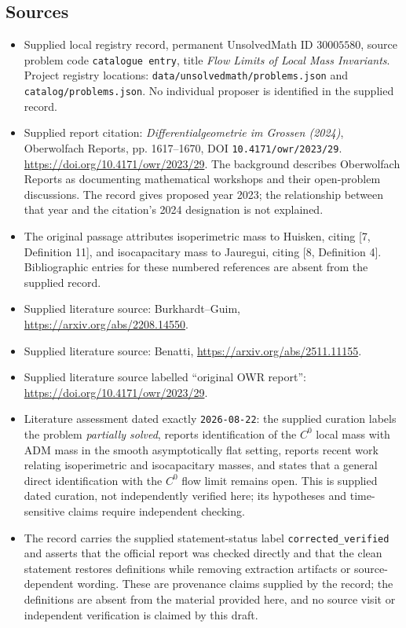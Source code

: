 \documentclass[11pt]{article}
\begin{document}
\subsection{Sources}
\begin{itemize}
\item Supplied local registry record, permanent UnsolvedMath ID \(30005580\), source problem code \texttt{catalogue entry}, title \emph{Flow Limits of Local Mass Invariants}. Project registry locations: \texttt{data/unsolvedmath/problems.json} and \texttt{catalog/problems.json}. No individual proposer is identified in the supplied record.
\item Supplied report citation: \emph{Differentialgeometrie im Grossen (2024)}, Oberwolfach Reports, pp. 1617--1670, DOI \texttt{10.4171/owr/2023/29}. \url{https://doi.org/10.4171/owr/2023/29}. The background describes Oberwolfach Reports as documenting mathematical workshops and their open-problem discussions. The record gives proposed year 2023; the relationship between that year and the citation's 2024 designation is not explained.
\item The original passage attributes isoperimetric mass to Huisken, citing [7, Definition 11], and isocapacitary mass to Jauregui, citing [8, Definition 4]. Bibliographic entries for these numbered references are absent from the supplied record.
\item Supplied literature source: Burkhardt--Guim, \url{https://arxiv.org/abs/2208.14550}.
\item Supplied literature source: Benatti, \url{https://arxiv.org/abs/2511.11155}.
\item Supplied literature source labelled ``original OWR report'': \url{https://doi.org/10.4171/owr/2023/29}.
\item Literature assessment dated exactly \texttt{2026-08-22}: the supplied curation labels the problem \emph{partially solved}, reports identification of the \(C^0\) local mass with ADM mass in the smooth asymptotically flat setting, reports recent work relating isoperimetric and isocapacitary masses, and states that a general direct identification with the \(C^0\) flow limit remains open. This is supplied dated curation, not independently verified here; its hypotheses and time-sensitive claims require independent checking.
\item The record carries the supplied statement-status label \texttt{corrected\_verified} and asserts that the official report was checked directly and that the clean statement restores definitions while removing extraction artifacts or source-dependent wording. These are provenance claims supplied by the record; the definitions are absent from the material provided here, and no source visit or independent verification is claimed by this draft.
\end{itemize}
\end{document}

